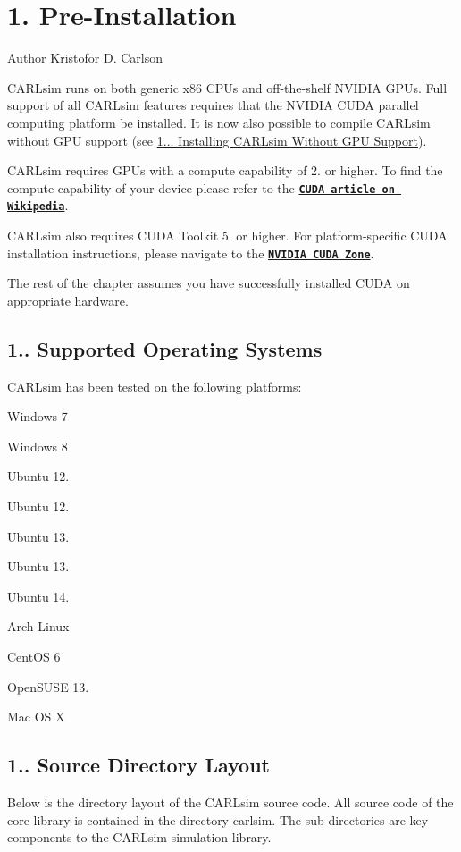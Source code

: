 \hypertarget{ch1_getting_started_ch1s1_preinstallation}{}\section{1. Pre-\/\+Installation}\label{ch1_getting_started_ch1s1_preinstallation}
\begin{DoxyAuthor}{Author}
Kristofor D. Carlson
\end{DoxyAuthor}
C\+A\+R\+Lsim runs on both generic x86 C\+P\+Us and off-\/the-\/shelf N\+V\+I\+D\+IA G\+P\+Us. Full support of all C\+A\+R\+Lsim features requires that the N\+V\+I\+D\+IA C\+U\+DA parallel computing platform be installed. It is now also possible to compile C\+A\+R\+Lsim without G\+PU support (see \hyperlink{ch1_getting_started_ch1s2s1s3_cpuonly}{1... Installing C\+A\+R\+Lsim Without G\+PU Support}).

C\+A\+R\+Lsim requires G\+P\+Us with a compute capability of 2. or higher. To find the compute capability of your device please refer to the \href{http://en.wikipedia.org/wiki/CUDA}{\tt {\bfseries C\+U\+DA article on Wikipedia}}.

C\+A\+R\+Lsim also requires C\+U\+DA Toolkit 5. or higher. For platform-\/specific C\+U\+DA installation instructions, please navigate to the \href{https://developer.nvidia.com/cuda-zone}{\tt {\bfseries N\+V\+I\+D\+IA C\+U\+DA Zone}}.

The rest of the chapter assumes you have successfully installed C\+U\+DA on appropriate hardware.\hypertarget{ch1_getting_started_ch1s1s1_os}{}\subsection{1.. Supported Operating Systems}\label{ch1_getting_started_ch1s1s1_os}
C\+A\+R\+Lsim has been tested on the following platforms\+:
\begin{DoxyItemize}
\item Windows 7
\item Windows 8
\item Ubuntu 12.
\item Ubuntu 12.
\item Ubuntu 13.
\item Ubuntu 13.
\item Ubuntu 14.
\item Arch Linux
\item Cent\+OS 6
\item Open\+S\+U\+SE 13.
\item Mac OS X
\end{DoxyItemize}\hypertarget{ch1_getting_started_ch1s1s2_os}{}\subsection{1.. Source Directory Layout}\label{ch1_getting_started_ch1s1s2_os}
Below is the directory layout of the C\+A\+R\+Lsim source code. All source code of the core library is contained in the directory {\ttfamily carlsim}. The sub-\/directories are key components to the C\+A\+R\+Lsim simulation library.

